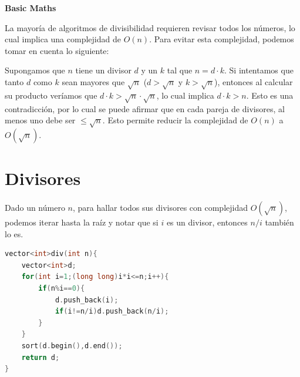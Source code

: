 \documentclass{article}
\begin{document}
\begin{center}
    \huge \textbf{Basic Maths}
    \vspace{0.5cm}
\end{center}
La mayoría de algoritmos de divisibilidad requieren revisar todos los números, lo cual implica una complejidad de $O(n)$. Para evitar esta complejidad, podemos tomar en cuenta lo siguiente:\par
Supongamos que $n$ tiene un divisor $d$ y un $k$ tal que $n = d \cdot k$. Si intentamos que tanto $d$ como $k$ sean mayores que $\sqrt{n}$ ($d > \sqrt{n}$ y $k > \sqrt{n}$), entonces al calcular su producto veríamos que $d \cdot k > \sqrt{n} \cdot \sqrt{n}$, lo cual implica $d \cdot k > n$. Esto es una contradicción, por lo cual se puede afirmar que en cada pareja de divisores, al menos uno debe ser $\le \sqrt{n}$. Esto permite reducir la complejidad de $O(n)$ a $O(\sqrt{n})$.
\section*{Divisores}
Dado un número $n$, para hallar todos sus divisores con complejidad $O(\sqrt{n})$, podemos iterar hasta la raíz y notar que si $i$ es un divisor, entonces $n/i$ también lo es.
\begin{lstlisting}[language=C++]
vector<int>div(int n){
    vector<int>d;
    for(int i=1;(long long)i*i<=n;i++){
        if(n%i==0){
            d.push_back(i);
            if(i!=n/i)d.push_back(n/i);
        }
    }
    sort(d.begin(),d.end());
    return d;
}
\end{lstlisting}
\end{document}
